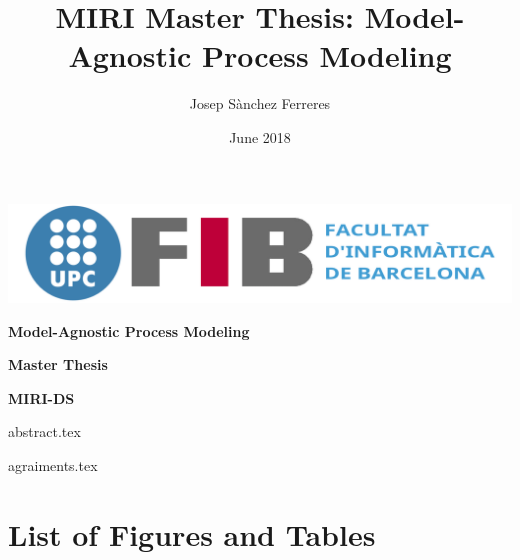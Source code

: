 \documentclass[10pt,a4paper]{report}
\title{MIRI Master Thesis: Model-Agnostic Process Modeling}
\author{Josep Sànchez Ferreres}
\date{June 2018}
\newcommand\blankpage{%
    \null
    \thispagestyle{empty}%
    \addtocounter{page}{-1}%
    \newpage}
\begin{document}
\begin{titlepage}

    \begin{center}
        \huge
        
        \includegraphics[width=\textwidth, height=0.1981\textwidth]{figures/logo3}

        \vspace{3.5cm}

        \textsf{\textbf{Model-Agnostic Process Modeling}}

        \vspace{3cm}

        \textsf{\textbf{Master Thesis}}

        \textsf{\textbf{MIRI-DS}}

        \vfill
        

        \vspace{1cm}
        
    \end{center}
    
\end{titlepage}

\blankpage

{abstract.tex}
\clearpage

{agraiments.tex}

\tableofcontents

\begingroup
\makeatletter
\chapter*{List of Figures and Tables}
\let\clearpage\relax
{}
\makeatother
\endgroup
\end{document}
